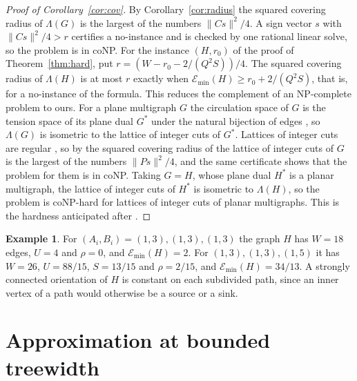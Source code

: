 \documentclass[11pt]{amsart}
\theoremstyle{definition}
\newtheorem{ex}[thm]{Example}
\theoremstyle{remark}
\numberwithin{equation}{section}
\newcommand{\Emin}{\mathcal E_{\min}}
\begin{document}
\begin{proof}[Proof of Corollary~\ref{cor:cov}]
By Corollary~\ref{cor:radius} the squared covering radius of $\Lambda(G)$ is the largest of the numbers $\|Cs\|^2/4$. A sign vector $s$ with $\|Cs\|^2/4>r$ certifies a no-instance and is checked by one rational linear solve, so the problem is in coNP. For the instance $(H,r_0)$ of the proof of Theorem~\ref{thm:hard}, put $r=(W-r_0-2/(Q^2S))/4$. The squared covering radius of $\Lambda(H)$ is at most $r$ exactly when $\Emin(H)\ge r_0+2/(Q^2S)$, that is, for a no-instance of the formula. This reduces the complement of an NP-complete problem to ours. For a plane multigraph $G$ the circulation space of $G$ is the tension space of its plane dual $G^*$ under the natural bijection of edges \cite[Chapter~14]{GR01}, so $\Lambda(G)$ is isometric to the lattice of integer cuts of $G^*$. Lattices of integer cuts are regular \cite[Lemma~1(i)]{DSV09}, so by \cite[Theorem~2]{DSV09} the squared covering radius of the lattice of integer cuts of $G$ is the largest of the numbers $\|Ps\|^2/4$, and the same certificate shows that the problem for them is in coNP. Taking $G=H$, whose plane dual $H^*$ is a planar multigraph, the lattice of integer cuts of $H^*$ is isometric to $\Lambda(H)$, so the problem is coNP-hard for lattices of integer cuts of planar multigraphs. This is the hardness anticipated after \cite[Proposition~3]{DSV09}.
\end{proof}

\begin{ex}\label{ex:small}
For $(A_i,B_i)=(1,3),(1,3),(1,3)$ the graph $H$ has $W=18$ edges, $U=4$ and $\rho=0$, and $\Emin(H)=2$. For $(1,3),(1,3),(1,5)$ it has $W=26$, $U=88/15$, $S=13/15$ and $\rho=2/15$, and $\Emin(H)=34/13$. A strongly connected orientation of $H$ is constant on each subdivided path, since an inner vertex of a path would otherwise be a source or a sink.
\end{ex}

\section{Approximation at bounded treewidth}\label{sec:fptas}
\end{document}
